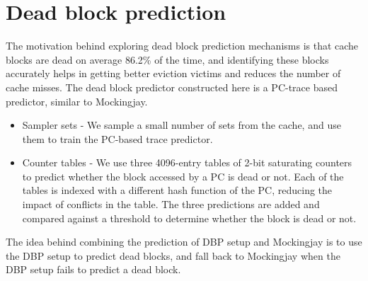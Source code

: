 

\section{Dead block prediction}

The motivation behind exploring dead block prediction mechanisms is that cache blocks are dead on average 86.2\% of the time, and identifying these blocks accurately helps in getting better eviction victims and reduces the number of cache misses.
The dead block predictor constructed here is a PC-trace based predictor, similar to Mockingjay.

\begin{itemize}
    \item Sampler sets - We sample a small number of sets from the cache, and use them to train the PC-based trace predictor.
    \item Counter tables - We use three 4096-entry tables of 2-bit saturating counters to predict whether the block accessed by a PC is dead or not. Each of the tables is indexed with a different hash function of the PC, reducing the impact of conflicts in the table.
    The three predictions are added and compared against a threshold to determine whether the block is dead or not.
\end{itemize}

The idea behind combining the prediction of DBP setup and Mockingjay is to use the DBP setup to predict dead blocks, and fall back to Mockingjay when the DBP setup fails to predict a dead block. 